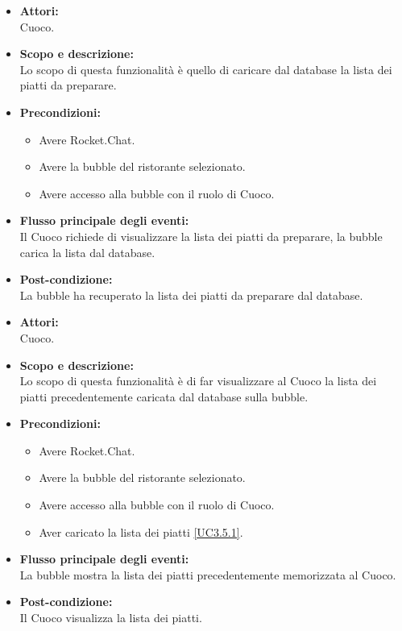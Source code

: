 
\begin{itemize}
	\item \textbf{Attori:}
	\\Cuoco.
	\item \textbf{Scopo e descrizione:} 
	\\Lo scopo di questa funzionalità è quello di caricare dal database la lista dei piatti da preparare.
	\item \textbf{Precondizioni:}
	\begin{itemize}
		\item Avere Rocket.Chat.
		\item Avere la bubble del ristorante selezionato.
		\item Avere accesso alla bubble con il ruolo di Cuoco.
	\end{itemize}
	\item \textbf{Flusso principale degli eventi:}
	\\Il Cuoco richiede di visualizzare la lista dei piatti da preparare, la bubble carica la lista dal database.
	\item \textbf{Post-condizione:}
	\\La bubble ha recuperato la lista dei piatti da preparare dal database.
\end{itemize}


\begin{itemize}
	\item \textbf{Attori:}
	\\Cuoco.
	\item \textbf{Scopo e descrizione:} 
	\\Lo scopo di questa funzionalità è di far visualizzare al Cuoco la lista dei piatti precedentemente caricata dal database sulla bubble.
	\item \textbf{Precondizioni:}
	\begin{itemize}
		\item Avere Rocket.Chat.
		\item Avere la bubble del ristorante selezionato.
		\item Avere accesso alla bubble con il ruolo di Cuoco.
		\item Aver caricato la lista dei piatti \ref{UC3.5.1}.
	\end{itemize}
	\item \textbf{Flusso principale degli eventi:}
	\\La bubble mostra la lista dei piatti precedentemente memorizzata al Cuoco.
	\item \textbf{Post-condizione:}
	\\Il Cuoco visualizza la lista dei piatti.
\end{itemize}


